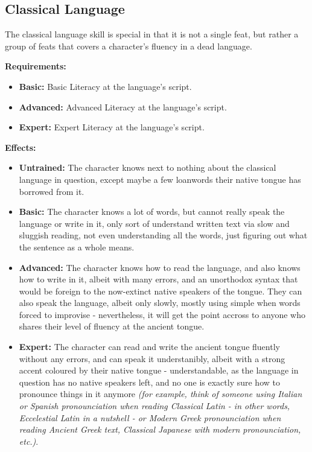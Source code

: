 \subsection{Classical Language}
The classical language skill is special in that it is not a single feat, but rather a group of feats that covers a character's fluency in a dead language.


\textbf{Requirements:}
\begin{itemize}
	\item \textbf{Basic:} Basic Literacy at the language's script.
	\item \textbf{Advanced:} Advanced Literacy at the language's script.
	\item \textbf{Expert:} Expert Literacy at the language's script.
\end{itemize}
\textbf{Effects:}
\begin{itemize}
	\item \textbf{Untrained:} The character knows next to nothing about the classical language in question, except maybe a few loanwords their native tongue has borrowed from it.
	\item \textbf{Basic:} The character knows a lot of words, but cannot really speak the language or write in it, only sort of understand written text via slow and sluggish reading, not even understanding all the words, just figuring out what the sentence as a whole means.
	\item \textbf{Advanced:} The character knows how to read the language, and also knows how to write in it, albeit with many errors, and an unorthodox syntax that would be foreign to the now-extinct native speakers of the tongue. They can also speak the language, albeit only slowly, mostly using simple when words forced to improvise - nevertheless, it will get the point accross to anyone who shares their level of fluency at the ancient tongue.
	\item \textbf{Expert:} The character can read and write the ancient tongue fluently without any errors, and can speak it understanibly, albeit with a strong accent coloured by their native tongue - understandable, as the language in question has no native speakers left, and no one is exactly sure how to pronounce things in it anymore \textit{(for example, think of someone using Italian or Spanish pronounciation when reading Classical Latin - in other words, Eccelestial Latin in a nutshell - or Modern Greek pronounciation when reading Ancient Greek text, Classical Japanese with modern pronounciation, etc.)}.
\end{itemize}\newpage
